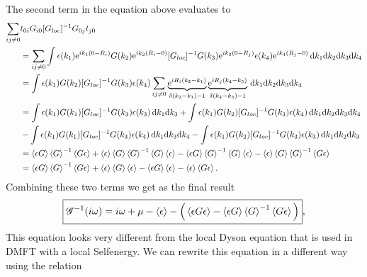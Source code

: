 \documentclass[12pt,a4paper]{scrartcl}
\numberwithin{equation}{section}
\begin{document}
The second term in the equation above evaluates to
\begin{align}
 \sum_{ij\neq 0} & t_{0i}  G_{i0}[G_{loc}]^{-1} G_{0j} t_{j0}  \nonumber \\
&= \sum_{ij\neq 0} \int \epsilon(k_1)\mathrm{e}^{ik_1(0-R_i)}  G(k_2)\mathrm{e}^{ik_2(R_i-0)} [G_{loc}]^{-1} G(k_3)\mathrm{e}^{ik_3(0-R_j)} \epsilon(k_4)\mathrm{e}^{ik_4(R_j-0)} \, \mathrm{d}k_1\mathrm{d}k_2\mathrm{d}k_3\mathrm{d}k_4 \\
&=  \int \epsilon(k_1)  G(k_2) [G_{loc}]^{-1} G(k_3) \epsilon(k_4) \sum_{ij\neq 0}\underbrace{\mathrm{e}^{iR_i(k_2-k_1)}}_{\delta(k_2-k_1)-1}\underbrace{\mathrm{e}^{iR_j(k_4-k_3)}}_{\delta(k_4-k_3)-1} \, \mathrm{d}k_1\mathrm{d}k_2\mathrm{d}k_3\mathrm{d}k_4 \\
&=  \int \epsilon(k_1)  G(k_1) [G_{loc}]^{-1} G(k_3) \epsilon(k_3)  \, \mathrm{d}k_1\mathrm{d}k_3
   +\int \epsilon(k_1)  G(k_2) [G_{loc}]^{-1} G(k_3) \epsilon(k_4)  \, \mathrm{d}k_1\mathrm{d}k_2 \mathrm{d}k_3\mathrm{d}k_4 \nonumber\\
&  -\int \epsilon(k_1)  G(k_1) [G_{loc}]^{-1} G(k_3) \epsilon(k_4)  \, \mathrm{d}k_1\mathrm{d}k_3\mathrm{d}k_4 
   -\int \epsilon(k_1)  G(k_2) [G_{loc}]^{-1} G(k_3) \epsilon(k_3)  \, \mathrm{d}k_1\mathrm{d}k_2\mathrm{d}k_3 \\
%
&=   \braket{\epsilon G} \braket{G}^{-1}  \braket{G \epsilon} +  \braket{\epsilon} \braket{G} \braket{G}^{-1}  \braket{G} \braket{\epsilon}
   - \braket{\epsilon G} \braket{G}^{-1}  \braket{G} \braket{\epsilon} - \braket{\epsilon} \braket{G} \braket{G}^{-1} \braket{ G \epsilon} \\
%
&=   \braket{\epsilon G} \braket{G}^{-1}  \braket{G \epsilon} +  \braket{\epsilon} \braket{G} \braket{\epsilon}
   - \braket{\epsilon G} \braket{\epsilon} - \braket{\epsilon}  \braket{G \epsilon}.
 \end{align}
 Combining these two terms we get as the final result
\begin{align}
\boxed{
 \mathscr{G}^{-1} (i\omega)
 = i\omega + \mu - \braket{\epsilon} - \Big( \braket{ \epsilon G \epsilon } - \braket{\epsilon G} \braket{G}^{-1}  \braket{ G \epsilon }  \Big) 
},\label{eq:eff_dyson_for_bath}
 \end{align}
 This equation looks very different from the local Dyson equation that is used in DMFT with a local
 Selfenergy. We can rewrite this equation in a different way using the relation
\end{document}
